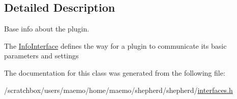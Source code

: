 \subsection{Detailed Description}
Base info about the plugin. 

The \hyperlink{class_info_interface}{InfoInterface} defines the way for a plugin to communicate its basic parameters and settings 

The documentation for this class was generated from the following file:\begin{CompactItemize}
\item 
/scratchbox/users/maemo/home/maemo/shepherd/shepherd/\hyperlink{interfaces_8h}{interfaces.h}\end{CompactItemize}
